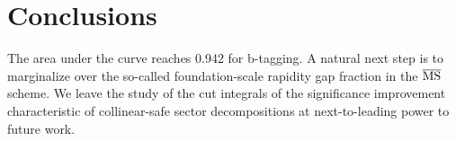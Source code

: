 \section{Conclusions}\label{sec:conclusions}

The area under the curve reaches 0.942 for b-tagging. A natural next
step is to marginalize over the so-called foundation-scale rapidity gap
fraction in the $\overline{\rm MS}$ scheme. We leave the study of the
cut integrals of the significance improvement characteristic of
collinear-safe sector decompositions at next-to-leading power to future
work.


